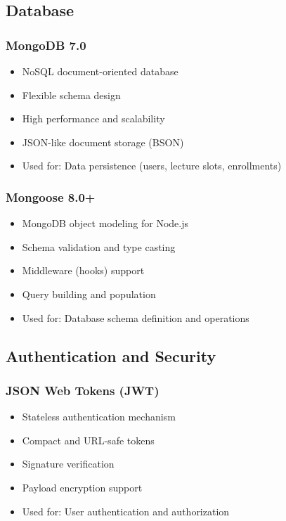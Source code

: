 \subsection{Database}

\subsubsection{MongoDB 7.0}
\begin{itemize}[leftmargin=*]
    \item NoSQL document-oriented database
    \item Flexible schema design
    \item High performance and scalability
    \item JSON-like document storage (BSON)
    \item Used for: Data persistence (users, lecture slots, enrollments)
\end{itemize}

\subsubsection{Mongoose 8.0+}
\begin{itemize}[leftmargin=*]
    \item MongoDB object modeling for Node.js
    \item Schema validation and type casting
    \item Middleware (hooks) support
    \item Query building and population
    \item Used for: Database schema definition and operations
\end{itemize}

\subsection{Authentication and Security}

\subsubsection{JSON Web Tokens (JWT)}
\begin{itemize}[leftmargin=*]
    \item Stateless authentication mechanism
    \item Compact and URL-safe tokens
    \item Signature verification
    \item Payload encryption support
    \item Used for: User authentication and authorization
\end{itemize}

